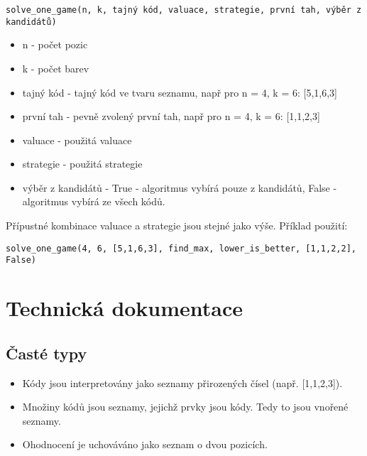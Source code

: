 \documentclass[12pt,a4paper]{article}
\begin{document}
\texttt{solve\_one\_game(n, k, tajný kód, valuace, strategie, první tah, výběr z kandidátů)}
\begin{itemize}
    \item n - počet pozic
    \item k - počet barev
    \item tajný kód - tajný kód ve tvaru seznamu, např pro n = 4, k = 6: [5,1,6,3]
    \item první tah - pevně zvolený první tah, např pro n = 4, k = 6: [1,1,2,3]
    \item valuace - použitá valuace
    \item strategie - použitá strategie
    \item výběr z kandidátů - True - algoritmus vybírá pouze z kandidátů, 
        False - algoritmus vybírá ze všech kódů.
\end{itemize}

Přípustné kombinace valuace a strategie jsou stejné jako výše.
Příklad použití:

\texttt{solve\_one\_game(4, 6, [5,1,6,3], find\_max, lower\_is\_better, [1,1,2,2], False)}











\section{Technická dokumentace}
\subsection{Časté typy}
\begin{itemize}
    \item Kódy jsou interpretovány jako seznamy přirozených čísel (např. [1,1,2,3]). 
    \item Množiny kódů jsou seznamy, jejichž prvky jsou kódy. Tedy to jsou vnořené seznamy. 
    \item Ohodnocení je uchováváno jako seznam o dvou pozicích. 
\end{itemize}
\end{document}
